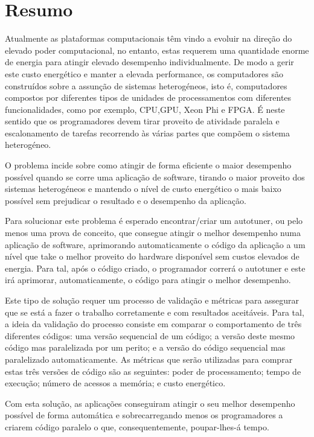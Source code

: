 \chapter*{Resumo}

Atualmente as plataformas computacionais têm vindo a evoluir na direção do elevado poder computacional, no entanto, estas requerem uma quantidade enorme de energia para atingir elevado desempenho individualmente.
De modo a gerir este custo energético e manter a elevada performance, os computadores são construídos sobre a assunção de sistemas heterogéneos, isto é, computadores compostos por diferentes tipos de unidades de processamentos com diferentes funcionalidades, como por exemplo, CPU,GPU, Xeon Phi e FPGA.
É neste sentido que os programadores devem tirar proveito de atividade paralela e escalonamento de tarefas recorrendo às várias partes que compõem o sistema heterogéneo.

O problema incide sobre como atingir de forma eficiente o maior desempenho possível quando se corre uma aplicação de software, tirando o maior proveito dos sistemas heterogéneos e mantendo o nível de custo energético o mais baixo possível sem prejudicar o resultado e o desempenho da aplicação.

Para solucionar este problema é esperado encontrar/criar um autotuner, ou pelo menos uma prova de conceito, que consegue atingir o melhor desempenho numa aplicação de software, aprimorando automaticamente o código da aplicação a um nível que take o melhor proveito do hardware disponível sem custos elevados de energia. Para tal, após o código criado, o programador correrá o autotuner e este irá aprimorar, automaticamente, o código para atingir o melhor desempenho.

Este tipo de solução requer um processo de validação e métricas para assegurar que se está a fazer o trabalho corretamente e com resultados aceitáveis. Para tal, a ideia da validação do processo consiste em comparar o comportamento de três diferentes códigos: uma versão sequencial de um código; a versão deste mesmo código mas paralelizada por um perito; e a versão do código sequencial mas paralelizado automaticamente. As métricas que serão utilizadas para comprar estas três versões de código são as seguintes: poder de processamento; tempo de execução; número de acessos a memória; e custo energético.

Com esta solução, as aplicações conseguiram atingir o seu melhor desempenho possível de forma automática e sobrecarregando menos os programadores a criarem código paralelo o que, consequentemente, poupar-lhes-á tempo.


